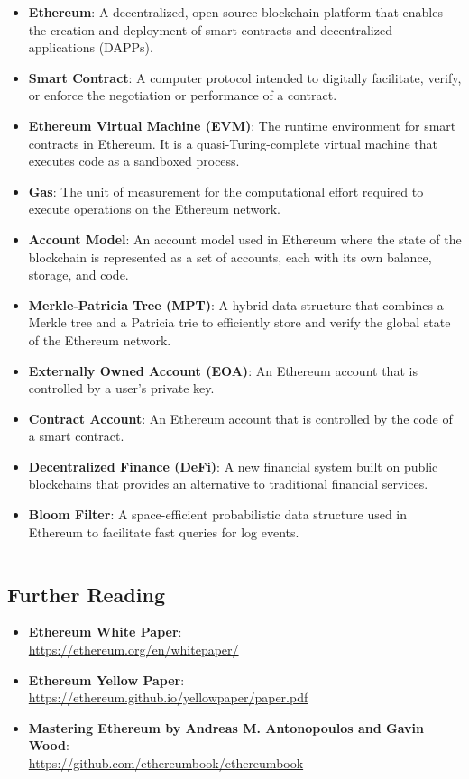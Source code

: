 \begin{itemize}
	\tightlist
	\item
	\textbf{Ethereum}: A decentralized, open-source blockchain platform
	that enables the creation and deployment of smart contracts and
	decentralized applications (DAPPs).
	\item
	\textbf{Smart Contract}: A computer protocol intended to digitally
	facilitate, verify, or enforce the negotiation or performance of a
	contract.
	\item
	\textbf{Ethereum Virtual Machine (EVM)}: The runtime environment for
	smart contracts in Ethereum. It is a quasi-Turing-complete virtual
	machine that executes code as a sandboxed process.
	\item
	\textbf{Gas}: The unit of measurement for the computational effort
	required to execute operations on the Ethereum network.
	\item
	\textbf{Account Model}: An account model used in Ethereum where the
	state of the blockchain is represented as a set of accounts, each with
	its own balance, storage, and code.
	\item
	\textbf{Merkle-Patricia Tree (MPT)}: A hybrid data structure that
	combines a Merkle tree and a Patricia trie to efficiently store and
	verify the global state of the Ethereum network.
	\item
	\textbf{Externally Owned Account (EOA)}: An Ethereum account that is
	controlled by a user's private key.
	\item
	\textbf{Contract Account}: An Ethereum account that is controlled by
	the code of a smart contract.
	\item
	\textbf{Decentralized Finance (DeFi)}: A new financial system built on
	public blockchains that provides an alternative to traditional
	financial services.
	\item
	\textbf{Bloom Filter}: A space-efficient probabilistic data structure
	used in Ethereum to facilitate fast queries for log events.
\end{itemize}

\begin{center}\rule{0.5\linewidth}{0.5pt}\end{center}

\subsection{Further Reading}\label{further-reading}

\begin{itemize}
	\tightlist
	\item
	\textbf{Ethereum White Paper}: \\ 
	\url{https://ethereum.org/en/whitepaper/}
	\item
	\textbf{Ethereum Yellow Paper}: \\
	\url{https://ethereum.github.io/yellowpaper/paper.pdf}
	\item
	\textbf{Mastering Ethereum by Andreas M. Antonopoulos and Gavin Wood}: \\
	\url{https://github.com/ethereumbook/ethereumbook}
\end{itemize}

